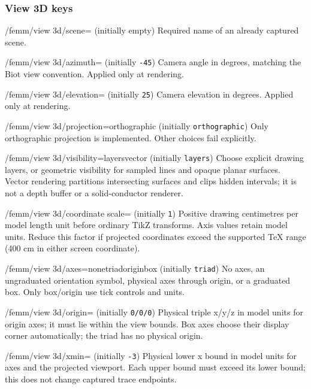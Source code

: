 \subsubsection{View 3D keys}
\begin{key}{/femm/view 3d/scene= (initially empty)}
Required name of an already captured scene.
\end{key}
\begin{key}{/femm/view 3d/azimuth= (initially \texttt{-45})}
Camera angle in degrees, matching the Biot view convention. Applied only at rendering.
\end{key}
\begin{key}{/femm/view 3d/elevation= (initially \texttt{25})}
Camera elevation in degrees. Applied only at rendering.
\end{key}
\begin{key}{/femm/view 3d/projection=orthographic (initially \texttt{orthographic})}
Only orthographic projection is implemented. Other choices fail explicitly.
\end{key}
\begin{key}{/femm/view 3d/visibility=layers\textbar vector (initially \texttt{layers})}
Choose explicit drawing layers, or geometric visibility for sampled lines and opaque planar surfaces. Vector rendering partitions intersecting surfaces and clips hidden intervals; it is not a depth buffer or a solid-conductor renderer.
\end{key}
\begin{key}{/femm/view 3d/coordinate scale= (initially \texttt{1})}
Positive drawing centimetres per model length unit before ordinary TikZ transforms. Axis values retain model units. Reduce this factor if projected coordinates exceed the supported TeX range (400 cm in either screen coordinate).
\end{key}
\begin{key}{/femm/view 3d/axes=none\textbar triad\textbar origin\textbar box (initially \texttt{triad})}
No axes, an ungraduated orientation symbol, physical axes through origin, or a graduated box. Only box/origin use tick controls and units.
\end{key}
\begin{key}{/femm/view 3d/origin= (initially \texttt{0/0/0})}
Physical triple x/y/z in model units for origin axes; it must lie within the view bounds. Box axes choose their display corner automatically; the triad has no physical origin.
\end{key}
\begin{key}{/femm/view 3d/xmin= (initially \texttt{-3})}
Physical lower x bound in model units for axes and the projected viewport. Each upper bound must exceed its lower bound; this does not change captured trace endpoints.
\end{key}
